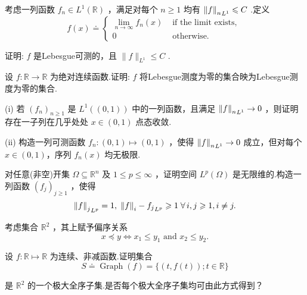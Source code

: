 \begin{rbhw}
考虑一列函数 ${f}_{n} \in  {L}^{1}\left( \mathbb{R}\right)$ ，满足对每个 $n \geq  1$ 均有 ${\norm{f}_{n}}_{{L}^{1}} \leqslant  C$ .定义
\[
f\left( x\right)  \doteq  \left\{  \begin{matrix} \mathop{\lim }\limits_{{n \rightarrow  \infty }}{f}_{n}\left( x\right) & \text{ if the limit exists, } \\  0 & \text{ otherwise. } \end{matrix}\right.
\]

证明: $f$ 是Lebesgue可测的，且 $\| f{\| }_{{L}^{1}} \leq  C$ .
\end{rbhw}

\begin{rbhw}
设 $f : \mathbb{R} \rightarrow  \mathbb{R}$ 为绝对连续函数.证明: $f$ 将Lebesgue测度为零的集合映为Lebesgue测度为零的集合.
\end{rbhw}

\begin{rbhw}
(i) 若 ${\left( {f}_{n}\right) }_{n \geq  1}$ 是 ${L}^{1}\left( \left(  {0,1}\right)  \right)$ 中的一列函数，且满足 ${\norm{f}_{n}}_{{L}^{1}} \rightarrow  0$ ，则证明存在一子列在几乎处处 $x \in  \left(  {0,1}\right)$ 点态收敛.


(ii) 构造一列可测函数 ${f}_{n} : \left(  {0,1}\right)   \mapsto  \left(  {0,1}\right)$ ，使得 ${\norm{f}_{n}}_{{L}^{1}} \rightarrow  0$ 成立，但对每个 $x \in  \left(  {0,1}\right)$，序列 ${f}_{n}\left( x\right)$ 均无极限.
\end{rbhw}

\begin{rbhw}
对任意(非空)开集 $\Omega  \subseteq  {\mathbb{R}}^{n}$ 及 $1 \leq  p \leq  \infty$ ，证明空间 ${L}^{p}\left( \Omega \right)$ 是无限维的.构造一列函数 ${\left( {f}_{j}\right) }_{j \geq  1}$ ，使得
\[
{\norm{f}_{j}}_{{L}^{p}} = 1,\;{\norm{f}_{i} - {f}_{j}}_{{L}^{p}} \geqslant  1\;\forall\,i,j \geqslant  1,i \neq  j.
\]
\end{rbhw}

\begin{rbhw}
考虑集合 ${\mathbb{R}}^{2}$ ，其上赋予偏序关系
\[
x \preccurlyeq  y \iff {x}_{1} \leq  {y}_{1}\text{ and }{x}_{2} \leq  {y}_{2}.
\]

设 $f : \mathbb{R} \mapsto  \mathbb{R}$ 为连续、非减函数.证明集合
\[
S \doteq  \operatorname{Graph}\left( f\right)  = \{ \left( {t,f\left( t\right) }\right) ;t \in  \mathbb{R}\}
\]

是 ${\mathbb{R}}^{2}$ 的一个极大全序子集.是否每个极大全序子集均可由此方式得到？
\end{rbhw}

